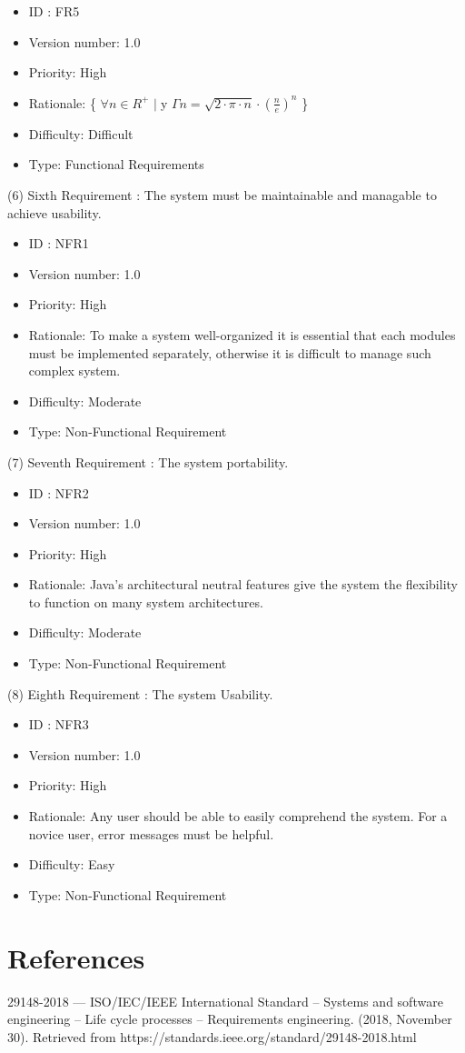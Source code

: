 \documentclass[a4paper, 11pt]{article}
\begin{document}
\begin{itemize}
    \item ID : FR5
    \item Version number: 1.0
    \item Priority: High
    \item Rationale: \{ $\forall n \in R^{+}$ $\mid\;$y $\Gamma n = \sqrt{2 \cdot \pi \cdot n}\cdot (\frac{n}{e})^{n}$ \}
    \item Difficulty: Difficult
    \item Type: Functional Requirements
\end{itemize}

(6) Sixth Requirement : The system must be maintainable and managable to achieve usability.

\begin{itemize}
    \item ID : NFR1
    \item Version number: 1.0
    \item Priority: High
    \item Rationale: To make a system well-organized it is essential that each modules must be implemented separately, otherwise it is difficult to manage such complex system.
    \item Difficulty: Moderate
    \item Type: Non-Functional Requirement
\end{itemize}

(7) Seventh Requirement : The system portability.

\begin{itemize}
    \item ID : NFR2
    \item Version number: 1.0
    \item Priority: High
    \item Rationale: Java's architectural neutral features give the system the flexibility to function on many system architectures.
    \item Difficulty: Moderate
    \item Type: Non-Functional Requirement
\end{itemize}

(8) Eighth Requirement : The system Usability.

\begin{itemize}
    \item ID : NFR3
    \item Version number: 1.0
    \item Priority: High
    \item Rationale: Any user should be able to easily comprehend the system. For a novice user, error messages must be helpful.
    \item Difficulty: Easy
    \item Type: Non-Functional Requirement
\end{itemize}


\section{References}

\setlength{\parindent}{1em}
29148-2018 --- ISO/IEC/IEEE International Standard -- Systems and software engineering -- Life cycle processes -- Requirements engineering. (2018, November 30). Retrieved from https://standards.ieee.org/standard/29148-2018.html
\end{document}
